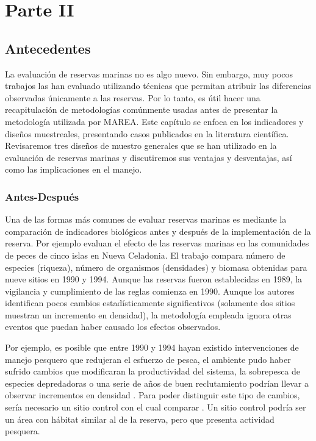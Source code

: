 \documentclass[]{krantz}
\begin{document}
\hypertarget{part-parte-ii}{%
\part{Parte II}\label{part-parte-ii}}

\hypertarget{antecedentes}{%
\chapter{Antecedentes}\label{antecedentes}}

La evaluación de reservas marinas no es algo nuevo. Sin embargo, muy
pocos trabajos las han evaluado utilizando técnicas que permitan
atribuir las diferencias observadas únicamente a las reservas. Por lo
tanto, es útil hacer una recapitulación de metodologías comúnmente
usadas antes de presentar la metodología utilizada por MAREA. Este
capítulo se enfoca en los indicadores y diseños muestreales, presentando
casos publicados en la literatura científica. Revisaremos tres diseños
de muestro generales que se han utilizado en la evaluación de reservas
marinas y discutiremos sus ventajas y desventajas, así como las
implicaciones en el manejo.

\hypertarget{antes-despues}{%
\section{Antes-Después}\label{antes-despues}}

Una de las formas más comunes de evaluar reservas marinas es mediante la
comparación de indicadores biológicos antes y después de la
implementación de la reserva. Por ejemplo \citet{wantiez_1997} evaluan
el efecto de las reservas marinas en las comunidades de peces de cinco
islas en Nueva Celadonia. El trabajo compara número de especies
(riqueza), número de organismos (densidades) y biomasa obtenidas para
nueve sitios en 1990 y 1994. Aunque las reservas fueron establecidas en
1989, la vigilancia y cumplimiento de las reglas comienza en 1990.
Aunque los autores identifican pocos cambios estadísticamente
significativos (solamente dos sitios muestran un incremento en
densidad), la metodología empleada ignora otras eventos que puedan haber
causado los efectos observados.

Por ejemplo, es posible que entre 1990 y 1994 hayan existido
intervenciones de manejo pesquero que redujeran el esfuerzo de pesca, el
ambiente pudo haber sufrido cambios que modificaran la productividad del
sistema, la sobrepesca de especies depredadoras o una serie de años de
buen reclutamiento podrían llevar a observar incrementos en densidad
\citep{szuwalski_2017, chavez_2003}. Para poder distinguir este tipo de
cambios, sería necesario un sitio control con el cual comparar
\citep{betti_2017}. Un sitio control podría ser un área con hábitat
similar al de la reserva, pero que presenta actividad pesquera.
\end{document}
